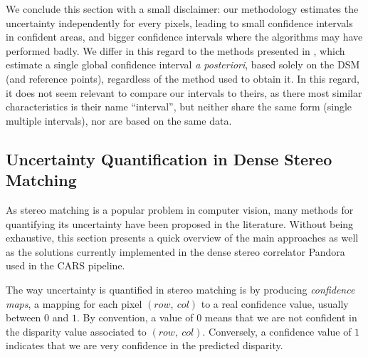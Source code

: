 We conclude this section with a small disclaimer: our methodology estimates the uncertainty independently for every pixels, leading to small confidence intervals in confident areas, and bigger confidence intervals where the algorithms may have performed badly. We differ in this regard to the methods presented in , which estimate a single global confidence interval \textit{a posteriori}, based solely on the DSM (and reference points), regardless of the method used to obtain it. In this regard, it does not seem relevant to compare our intervals to theirs, as there most similar characteristics is their name ``interval'', but neither share the same form (single \vs multiple intervals), nor are based on the same data. 

\subsection{Uncertainty Quantification in Dense Stereo Matching}\label{sec:uncertainty_pandora}
As stereo matching is a popular problem in computer vision, many methods for quantifying its uncertainty have been proposed in the literature. Without being exhaustive, this section presents a quick overview of the main approaches as well as the solutions currently implemented in the dense stereo correlator Pandora used in the CARS pipeline.

The way uncertainty is quantified in stereo matching is by producing \textit{confidence maps}, \ie a mapping for each pixel $(row, ~col)$ to a real confidence value, usually between $0$ and $1$. By convention, a value of $0$ means that we are not confident in the disparity value associated to $(row, ~col)$. Conversely, a confidence value of $1$ indicates that we are very confidence in the predicted disparity.

